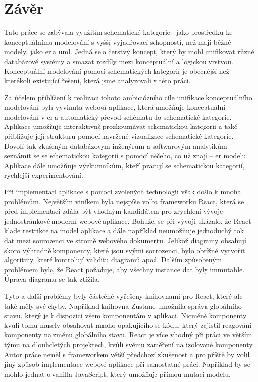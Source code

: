 \chapter*{Závěr}

Tato práce se zabývala využitím schematické kategorie~\cite{svoboda_categorical_2021} jako prostředku ke konceptuálnímu modelování s vyšší vyjadřovací schopností, než mají běžné modely, jako \acrshort{er} a \acrshort{uml}.
Jedná se o čerstvý koncept, který by mohl unifikovat různé databázové systémy a smazat rozdíly mezi konceptuální a logickou vrstvou.
Konceptuální modelování pomocí schematických kategorií je obecnější než kterékoli existující řešení, která jsme analyzovali v této práci.

Za účelem přiblížení k realizaci tohoto ambiciózního cíle unifikace konceptuálního modelování byla vyvinuta webová aplikace, která umožňuje konceptuální modelování v \acrshort{er} a automatický převod schématu do schematické kategorie.
Aplikace umožňuje interaktivně prozkoumávat schematickou kategorii a také přibližuje její strukturu pomocí navržené vizualizace schematické kategorie.
Dovolí tak zkušeným databázovým inženýrům a softwarovým analytikům seznámit se se schematickou kategorií s pomocí něčeho, co už znají -- \acrshort{er} modelu.
Aplikace dále umožňuje výzkumníkům, kteří pracují se schematickou kategorií, rychlejší experimentování.

Při implementaci aplikace s pomocí zvolených technologií však došlo k mnoha problémům.
Největším viníkem byla nejspíše volba frameworku React, která se před implementací zdála být vhodným kandidátem pro zrychlení vývoje jednostránkové moderní webové aplikace.
Bohužel se při vývoji ukázalo, že React klade restrikce na model aplikace a dále například neumožňuje jednoduchý tok dat mezi sourozenci ve stromě webového dokumentu.
Jelikož diagramy obsahují skoro výhradně komponenty, které jsou svými sourozenci, bylo obtížné vytvořit algoritmy, které kontrolují validitu diagramů apod.
Dalším způsobeným problémem bylo, že React požaduje, aby všechny instance dat byly immutable.
Úprava diagramu se tak ztížila.

Tyto a další problémy byly částečně vyřešeny knihovnami pro React, které ale také měly své chyby.
Například knihovna Zustand umožnila správu globálního stavu, který je k dispozici všem komponentám v aplikaci.
Nicméně komponenty kvůli tomu musely obsahovat mnoho opakujícího se kódu, který zajistil reagování komponenty na změnu globálního stavu.
React je více vhodný při práci ve větším týmu na dlouholetých projektech, kvůli svému zaměření na izolované komponenty.
Autor práce neměl s frameworkem větší předchozí zkušenost a pro příště by volil jiný způsob implementace webové aplikace při samostatné práci.
Například by se mohlo jednat o vanilla JavaScript, který umožňuje přímou mutaci modelu.

